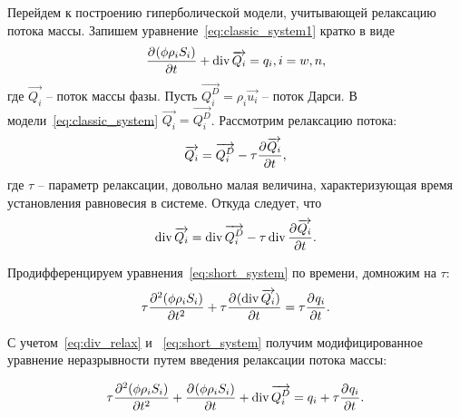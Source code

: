 Перейдем к построению гиперболической модели, учитывающей релаксацию потока массы. 
Запишем уравнение~\eqref{eq:classic_system1} кратко в виде
\begin{equation} \label{eq:short_system}
   \pd{(\phi \rho_i S_i)}{t} + \diver{ \overrightarrow{Q_i}} = q_i, i = w,n,
\end{equation}
где $\overrightarrow{Q_i}$ -- поток массы фазы.
Пусть $\overrightarrow{Q_i^D} = \rho_i \overrightarrow{u_i}$ -- поток Дарси.
В модели~\eqref{eq:classic_system} $\overrightarrow{Q_i} = \overrightarrow{Q_i^D}$.
Рассмотрим релаксацию потока:
\begin{equation}
 \overrightarrow{Q_i} = \overrightarrow{Q_i^D} - \tau \pd{\overrightarrow{Q_i}}{t},
\end{equation}
где $\tau$ -- параметр релаксации, довольно малая величина, характеризующая время установления равновесия в системе. Откуда следует, что
\begin{equation} \label{eq:div_relax}
 \diver{\overrightarrow{Q_i}} = \diver{\overrightarrow{Q_i^D}} - \tau \diver{\pd{\overrightarrow{Q_i}}{t}}.
\end{equation}

Продифференцируем уравнения~\eqref{eq:short_system} по времени, домножим на $\tau$:
\begin{equation}
  \tau \pd[2]{(\phi \rho_i S_i)}{t} + \tau \pd{(\diver{ \overrightarrow{Q_i}})}{t} = \tau \pd{q_i}{t}.
\end{equation}

С учетом~\eqref{eq:div_relax} и ~\eqref{eq:short_system} получим модифицированное уравнение неразрывности путем введения релаксации потока массы:

\begin{equation} \label{eq:mod_system}
  \tau \pd[2]{(\phi \rho_i S_i)}{t} + \pd{(\phi \rho_i S_i)}{t} + \diver{ \overrightarrow{Q_i^D}} = q_i + \tau \pd{q_i}{t}.
\end{equation}

